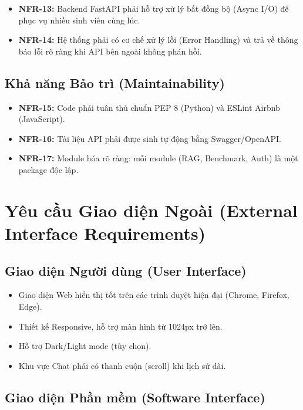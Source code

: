 \begin{itemize}[itemsep=4pt]
  \item \textbf{NFR-13:} Backend FastAPI phải hỗ trợ xử lý bất đồng bộ (Async I/O) để phục vụ nhiều sinh viên cùng lúc.
  \item \textbf{NFR-14:} Hệ thống phải có cơ chế xử lý lỗi (Error Handling) và trả về thông báo lỗi rõ ràng khi API bên ngoài không phản hồi.
\end{itemize}

\subsection{Khả năng Bảo trì (Maintainability)}

\begin{itemize}[itemsep=4pt]
  \item \textbf{NFR-15:} Code phải tuân thủ chuẩn PEP 8 (Python) và ESLint Airbnb (JavaScript).
  \item \textbf{NFR-16:} Tài liệu API phải được sinh tự động bằng Swagger/OpenAPI.
  \item \textbf{NFR-17:} Module hóa rõ ràng: mỗi module (RAG, Benchmark, Auth) là một package độc lập.
\end{itemize}

\section{Yêu cầu Giao diện Ngoài (External Interface Requirements)}

\subsection{Giao diện Người dùng (User Interface)}

\begin{itemize}[itemsep=3pt]
  \item Giao diện Web hiển thị tốt trên các trình duyệt hiện đại (Chrome, Firefox, Edge).
  \item Thiết kế Responsive, hỗ trợ màn hình từ 1024px trở lên.
  \item Hỗ trợ Dark/Light mode (tùy chọn).
  \item Khu vực Chat phải có thanh cuộn (scroll) khi lịch sử dài.
\end{itemize}

\subsection{Giao diện Phần mềm (Software Interface)}

